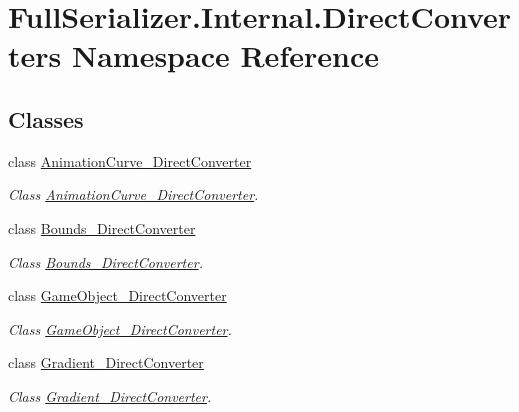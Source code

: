 \hypertarget{namespace_full_serializer_1_1_internal_1_1_direct_converters}{}\section{Full\+Serializer.\+Internal.\+Direct\+Converters Namespace Reference}
\label{namespace_full_serializer_1_1_internal_1_1_direct_converters}
\subsection*{Classes}
\begin{DoxyCompactItemize}
\item 
class \hyperlink{class_full_serializer_1_1_internal_1_1_direct_converters_1_1_animation_curve___direct_converter}{Animation\+Curve\+\_\+\+Direct\+Converter}
\begin{DoxyCompactList}\small\item\em Class \hyperlink{class_full_serializer_1_1_internal_1_1_direct_converters_1_1_animation_curve___direct_converter}{Animation\+Curve\+\_\+\+Direct\+Converter}. \end{DoxyCompactList}\item 
class \hyperlink{class_full_serializer_1_1_internal_1_1_direct_converters_1_1_bounds___direct_converter}{Bounds\+\_\+\+Direct\+Converter}
\begin{DoxyCompactList}\small\item\em Class \hyperlink{class_full_serializer_1_1_internal_1_1_direct_converters_1_1_bounds___direct_converter}{Bounds\+\_\+\+Direct\+Converter}. \end{DoxyCompactList}\item 
class \hyperlink{class_full_serializer_1_1_internal_1_1_direct_converters_1_1_game_object___direct_converter}{Game\+Object\+\_\+\+Direct\+Converter}
\begin{DoxyCompactList}\small\item\em Class \hyperlink{class_full_serializer_1_1_internal_1_1_direct_converters_1_1_game_object___direct_converter}{Game\+Object\+\_\+\+Direct\+Converter}. \end{DoxyCompactList}\item 
class \hyperlink{class_full_serializer_1_1_internal_1_1_direct_converters_1_1_gradient___direct_converter}{Gradient\+\_\+\+Direct\+Converter}
\begin{DoxyCompactList}\small\item\em Class \hyperlink{class_full_serializer_1_1_internal_1_1_direct_converters_1_1_gradient___direct_converter}{Gradient\+\_\+\+Direct\+Converter}. \end{DoxyCompactList}\item 

\end{DoxyCompactItemize}
